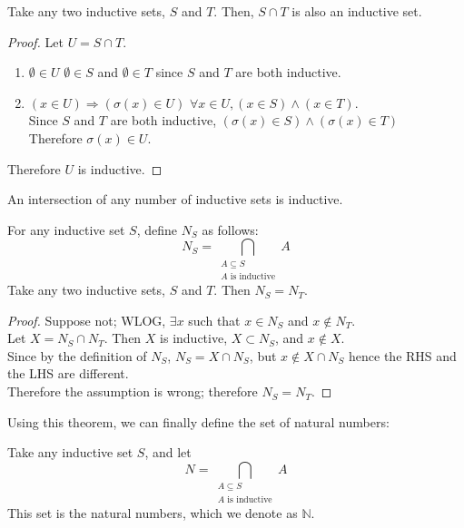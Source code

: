\documentclass{report}
\begin{document}
		\begin{thm}
			Take any two inductive sets, $S$ and $T$. Then, $S \cap T$ is also an inductive set.
		\end{thm}
		
		\begin{proof}
			Let $U=S \cap T$.
			\begin{enumerate}
				\item $\emptyset \in U$
				\subitem $\emptyset \in S$ and $\emptyset \in T$ since $S$ and $T$ are both inductive.
				\item $(x \in U) \Rightarrow (\sigma(x) \in U)$
				\subitem $\forall x \in U, (x \in S) \wedge (x \in T)$.\\
				Since $S$ and $T$ are both inductive, $(\sigma(x) \in S) \wedge (\sigma(x) \in T)$\\
				Therefore $\sigma(x) \in U$.
			\end{enumerate} 
			Therefore $U$ is inductive.
		\end{proof}
		
		\begin{coro}
			An intersection of any number of inductive sets is inductive.
		\end{coro}
		
		\begin{thm}
			For any inductive set $S$, define $N_S$ as follows:
			\begin{displaymath}
			N_S=\bigcap_{\substack{A \subseteq S\\A \text{ is inductive}}}A
			\end{displaymath}
			Take any two inductive sets, $S$ and $T$. Then $N_S=N_T$.
		\end{thm}
		
		\begin{proof}
			Suppose not; WLOG, $\exists x$ such that $x \in N_S$ and $x \notin N_T$.\\
			Let $X=N_S \cap N_T$. Then $X$ is inductive, $X \subset N_S$, and $x \notin X$.\\
			Since by the definition of $N_S$, $N_S=X \cap N_S$, but $x \notin X \cap N_S$ hence the RHS and the LHS are different.\\
			Therefore the assumption is wrong; therefore $N_S=N_T$.
		\end{proof}
		
		Using this theorem, we can finally define the set of natural numbers:
		\begin{defn} \label{def_N}
			Take any inductive set $S$, and let
			\begin{displaymath}
			N=\bigcap_{\substack{A \subseteq S\\A \text{ is inductive}}}A
			\end{displaymath}
			This set is the natural numbers, which we denote as $\mathbb{N}$.
		\end{defn}
		
\end{document}
